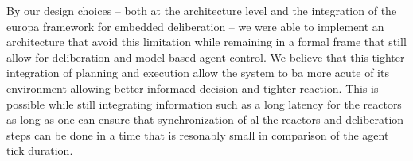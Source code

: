 By our design choices -- both at the architecture level and the
integration of the europa framework for embedded deliberation -- we
were able to implement an architecture that avoid this limitation
while remaining in a formal frame that still allow for deliberation
and model-based agent control. We believe that this tighter
integration of planning and execution allow the system to ba more
acute of its environment allowing better informaed decision and
tighter reaction. This is possible while still integrating information
such as a long latency for the reactors as long as one can ensure that
synchronization of al the reactors and deliberation steps can be done
in a time that is resonably small in comparison of the agent tick
duration.








